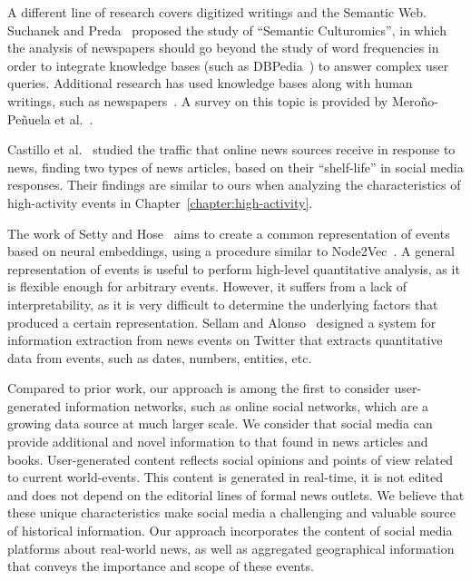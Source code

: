 A different line of research covers digitized writings and the Semantic Web.
%
Suchanek and Preda~\cite{Suchanek:2014:SC:2732977.2732994} proposed the study of
``Semantic Culturomics'', in which the analysis of newspapers should go beyond
the study of word frequencies in order to integrate knowledge bases (such as
DBPedia~\cite{dbpedia}) to answer complex user queries. 
%
Additional research has used knowledge bases along with human writings, such as
newspapers~\cite{Huet:2013:MHL:2509558.2509567,DS/CN175}. 
%
A survey on this topic is provided by Mero\~no-Pe\~nuela et
al.~\cite{merono2014semantic}.

Castillo et al.~\cite{Castillo:2014} studied the traffic
that online news sources receive in response to news, finding two types of news
articles, based on their ``shelf-life'' in social media responses. 
%
Their findings are similar to ours when analyzing the characteristics of
high-activity events in Chapter~\ref{chapter:high-activity}.
%

The work of Setty and Hose~\cite{Setty:2018:ENE:3209978.3210136} aims to create
a common representation of events based on neural embeddings, using a procedure
similar to Node2Vec~\cite{Grover:2016:NSF:2939672.2939754}.
%
A general representation of events is useful to perform high-level quantitative
analysis, as it is flexible enough for arbitrary events.
%
However, it suffers from a lack of interpretability, as it is very difficult to determine
the underlying factors that produced a certain representation.
%
Sellam and Alonso~\cite{10.1007/978-3-319-19890-3_17} designed a system for
information extraction from news events on Twitter that extracts quantitative
data from events, such as dates, numbers, entities, etc.


Compared to prior work, our approach is among the first to consider user-generated
information networks, such as online social networks, which are a growing data
source at much larger scale.  
%
We consider that social media can provide additional and novel information to
that found in news articles and books. 
%
User-generated content reflects social opinions and points of view related to
current world-events. 
%
This content is generated in real-time, it is not edited and does not depend on
the editorial lines of formal news outlets.  
%
We believe that these unique characteristics make social media a challenging and
valuable source of historical information.  
%
Our approach incorporates the content of social media platforms about real-world
news, as well as aggregated geographical information that conveys the importance
and scope of these events.

%
